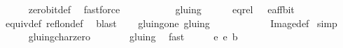 \begin{isabellebody}
\ \ \ \ \isamarkupfalse%
\ zero{\isacharunderscore}bit{\isacharunderscore}def\ \isamarkupfalse%
\ fastforce\isanewline
\ \ \isamarkupfalse%
\ {\isachardoublequoteopen}{\isacharparenleft}{\isacharparenleft}{\isacharparenleft}{}{\isacharcomma}\ {}{\isacharparenright}{\isacharcomma}\ {}{\isacharparenright}{\isacharcomma}\ {\isacharparenleft}{\isacharparenleft}{}{\isacharcomma}\ {}{\isacharparenright}{\isacharcomma}\ {}{\isacharparenright}{\isacharparenright}\ {\isasymin}\ gluing{\isachardoublequoteclose}\isanewline
\ \ \ \ \isamarkupfalse%
\ eq{\isacharunderscore}rel\ {\isacartoucheopen}{\isacharparenleft}{\isacharparenleft}{}{\isacharcomma}{}{\isacharparenright}{\isacharcomma}{}{\isacharparenright}\ {\isasymin}\ e{\isacharunderscore}aff{\isacharunderscore}bit{\isacartoucheclose}\isanewline
\ \ \ \ \isamarkupfalse%
\ equiv{\isacharunderscore}def\ refl{\isacharunderscore}on{\isacharunderscore}def\ \isamarkupfalse%
\ blast\isanewline
\ \ \isamarkupfalse%
\ gluing{\isacharunderscore}one{\isacharcolon}\ {\isachardoublequoteopen}gluing\ {\isacharbackquote}{\isacharbackquote}\ {\isacharbraceleft}{\isacharparenleft}{\isacharparenleft}{}{\isacharcomma}\ {}{\isacharparenright}{\isacharcomma}\ {}{\isacharparenright}{\isacharbraceright}\ {\isacharequal}\ {\isacharbraceleft}{\isacharparenleft}{\isacharparenleft}{}{\isacharcomma}{}{\isacharparenright}{\isacharcomma}{}{\isacharparenright}{\isacharbraceright}{\isachardoublequoteclose}\isanewline
\ \ \ \ \isamarkupfalse%
\ Image{\isacharunderscore}def\ \isamarkupfalse%
{\isacharparenleft}simp{\isacharparenright}\isanewline
\ \ \ \ \isamarkupfalse%
\ gluing{\isacharunderscore}char{\isacharunderscore}zero\ {\isacartoucheopen}{\isacharparenleft}{\isacharparenleft}{\isacharparenleft}{}{\isacharcomma}\ {}{\isacharparenright}{\isacharcomma}\ {}{\isacharparenright}{\isacharcomma}\ {\isacharparenleft}{\isacharparenleft}{}{\isacharcomma}\ {}{\isacharparenright}{\isacharcomma}\ {}{\isacharparenright}{\isacharparenright}\ {\isasymin}\ gluing{\isacartoucheclose}\ \isamarkupfalse%
\ fast\isanewline
\ \ \isacommand{{\isacharbraceleft}}\isamarkupfalse%
\ \isamarkupfalse%
\ e{}\ e{}\ b\isanewline

\end{isabellebody}
